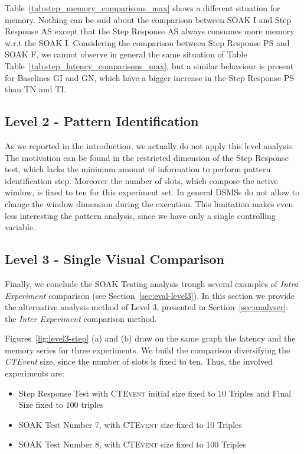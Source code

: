 Table~\ref{tab:step_memory_comparisons_max} shows a different situation for memory. Nothing can be said about the comparison between SOAK I and Step Response AS except that the Step Response AS always consumes more memory w.r.t the SOAK I. Considering the comparison between Step Response PS and SOAK F, we cannot observe in general the same situation of Table Table~\ref{tab:step_latency_comparisons_max}, but a similar behaviour is present for Baselines GI and GN, which have a bigger increase in the Step Response PS than TN and TI.





\subsection{Level 2 - Pattern Identification}\label{sec:level2-step-pattern}

As we reported in the introduction, we actually do not apply this level analysis. The motivation can be found in the restricted dimension of the Step Response test, which lacks the minimum amount of information to perform pattern identification step. Moreover the number of slots, which compose the active window, is fixed to ten for this experiment set. In general DSMSs do not allow to change the window dimension during the execution. This limitation makes even less interesting the pattern analysis, since we have only a single controlling variable.

\subsection{Level 3 - Single Visual Comparison}\label{sec:level3-step-inter}

Finally, we conclude the SOAK Testing analysis trough several examples of \textit{Intra Experiment} comparison (see Section~\ref{sec:eval-level3}). In this section we provide the alternative analysis method of Level 3, presented in Section~\ref{sec:analyser}: the \textit{Inter Experiment} comparison method.

Figures~\ref{fig:level3-step} (a) and (b) draw on the same graph the latency and the memory series for three experiments.  We build the comparison diversifying the \textit{CTEvent} size, since the number of slots is fixed to ten. Thus, the involved experiments are:
\begin{itemize}
\item Step Response Test with \textsc{CTEvent} initial size fixed to 10 Triples and Final Size fixed to 100 triples
\item SOAK Test Number 7, with \textsc{CTEvent} size fixed to 10 Triples
\item SOAK Test Number 8, with \textsc{CTEvent} size fixed to 100 Triples
\end{itemize}


